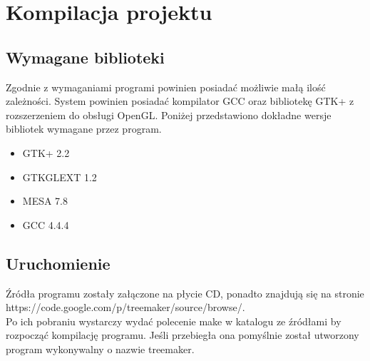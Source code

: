 \section{Kompilacja projektu}
\subsection{Wymagane biblioteki}
Zgodnie z wymaganiami programi powinien posiadać możliwie małą ilość zależności. System powinien posiadać kompilator GCC oraz bibliotekę GTK+ z rozszerzeniem do obsługi OpenGL.
Poniżej przedstawiono dokładne wersje bibliotek wymagane przez program.
\begin{itemize}
\item GTK+ 2.2
\item GTKGLEXT 1.2
\item MESA 7.8
\item GCC 4.4.4
\end{itemize}
\subsection{Uruchomienie}
Źródła programu zostały załączone na płycie CD, ponadto znajdują się na stronie https://code.google.com/p/treemaker/source/browse/.\\
Po ich pobraniu wystarczy wydać polecenie make w katalogu ze źródłami by rozpocząć kompilację programu. Jeśli przebiegła ona pomyślnie został utworzony
program wykonywalny o nazwie treemaker.
